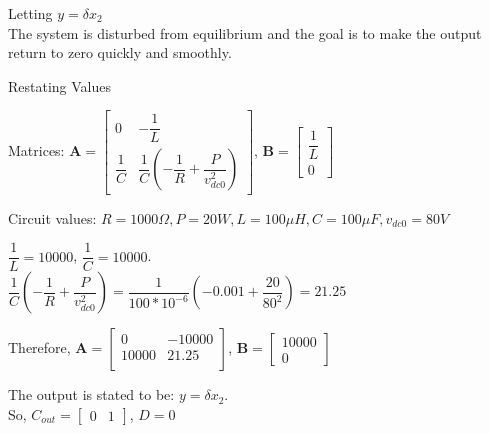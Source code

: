 \documentclass[12pt]{article}
\begin{document}
Letting $y = \delta x_2$\\

The system is disturbed from equilibrium and the goal is to make the output return to zero quickly and smoothly.

\begin{tcolorbox}[enhanced, frame hidden, colback=white, borderline west={1pt}{0pt}{gray}]
  \large{Restating Values}
  \normalsize{}
  \begin{tcolorbox}[enhanced, frame hidden, colback=white, borderline west={1pt}{0pt}{gray}]
    Matrices: $\textbf{A} = \begin{bmatrix}
      0 & -\dfrac{1}{L}\\
      \dfrac{1}{C} & \dfrac{1}{C}(-\dfrac{1}{R} + \dfrac{P}{v^2_{dc0}})
    \end{bmatrix}$, $\textbf{B} = \begin{bmatrix}
      \dfrac{1}{L}\\
      0
    \end{bmatrix}$
  \end{tcolorbox}
  \begin{tcolorbox}[enhanced, frame hidden, colback=white, borderline west={1pt}{0pt}{gray}]
    Circuit values: $R = 1000\Omega, P = 20W, L = 100\mu H, C = 100\mu F, v_{dc0} = 80V$
  \end{tcolorbox}
  \begin{tcolorbox}[enhanced, frame hidden, colback=white, borderline west={1pt}{0pt}{gray}]
    $\dfrac{1}{L} = 10000$, $\dfrac{1}{C} = 10000$.\\

    $\dfrac{1}{C}(-\dfrac{1}{R} + \dfrac{P}{v^2_{dc0}}) = \dfrac{1}{100 * 10^{-6}}(-0.001 + \dfrac{20}{80^2}) = 21.25$
  \end{tcolorbox} 
  \begin{tcolorbox}[enhanced, frame hidden, colback=white, borderline west={1pt}{0pt}{gray}]
    Therefore, $\textbf{A} = \begin{bmatrix}
      0 & -10000\\
      10000 & 21.25\\
    \end{bmatrix}$, $\textbf{B} = \begin{bmatrix}
      10000\\
      0
    \end{bmatrix}$
  \end{tcolorbox} 
  \begin{tcolorbox}[enhanced, frame hidden, colback=white, borderline west={1pt}{0pt}{gray}]
    The output is stated to be: $y = \delta x_2$.\\

    So, $C_{out} = \begin{bmatrix}
      0&1
    \end{bmatrix}$, $D = 0$
  \end{tcolorbox} 
\end{tcolorbox} 
\end{document}

